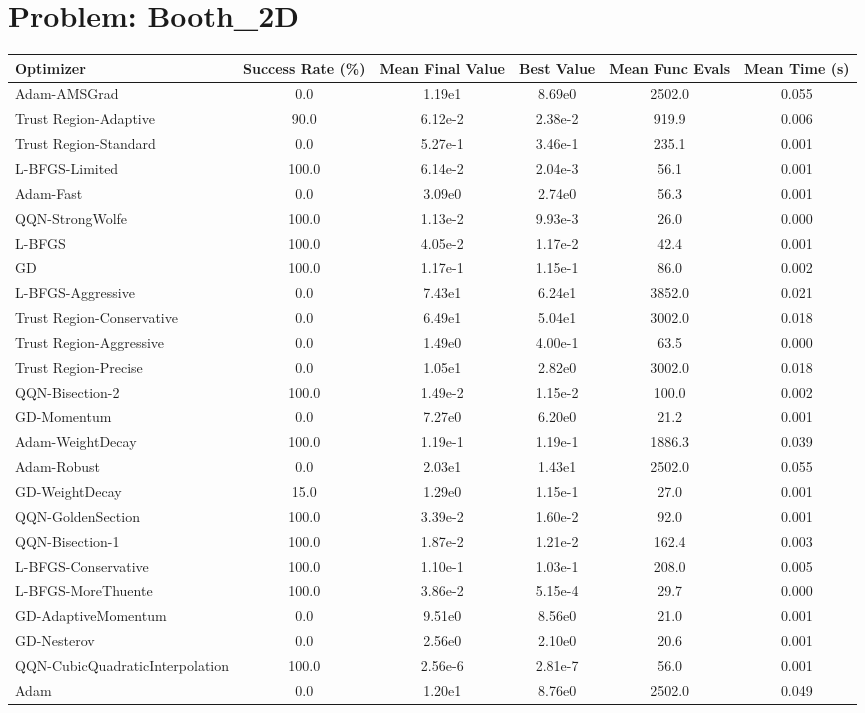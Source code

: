 \documentclass{article}
\begin{document}
\section{Problem: Booth\_2D}
\begin{longtable}{p{3cm}*{5}{c}}
\toprule
\textbf{Optimizer} & \textbf{Success Rate (\%)} & \textbf{Mean Final Value} & \textbf{Best Value} & \textbf{Mean Func Evals} & \textbf{Mean Time (s)} \\
\midrule
Adam-AMSGrad & 0.0 & 1.19e1 & 8.69e0 & 2502.0 & 0.055 \\
Trust Region-Adaptive & 90.0 & 6.12e-2 & 2.38e-2 & 919.9 & 0.006 \\
Trust Region-Standard & 0.0 & 5.27e-1 & 3.46e-1 & 235.1 & 0.001 \\
L-BFGS-Limited & 100.0 & 6.14e-2 & 2.04e-3 & 56.1 & 0.001 \\
Adam-Fast & 0.0 & 3.09e0 & 2.74e0 & 56.3 & 0.001 \\
QQN-StrongWolfe & 100.0 & 1.13e-2 & 9.93e-3 & 26.0 & 0.000 \\
L-BFGS & 100.0 & 4.05e-2 & 1.17e-2 & 42.4 & 0.001 \\
GD & 100.0 & 1.17e-1 & 1.15e-1 & 86.0 & 0.002 \\
L-BFGS-Aggressive & 0.0 & 7.43e1 & 6.24e1 & 3852.0 & 0.021 \\
Trust Region-Conservative & 0.0 & 6.49e1 & 5.04e1 & 3002.0 & 0.018 \\
Trust Region-Aggressive & 0.0 & 1.49e0 & 4.00e-1 & 63.5 & 0.000 \\
Trust Region-Precise & 0.0 & 1.05e1 & 2.82e0 & 3002.0 & 0.018 \\
QQN-Bisection-2 & 100.0 & 1.49e-2 & 1.15e-2 & 100.0 & 0.002 \\
GD-Momentum & 0.0 & 7.27e0 & 6.20e0 & 21.2 & 0.001 \\
Adam-WeightDecay & 100.0 & 1.19e-1 & 1.19e-1 & 1886.3 & 0.039 \\
Adam-Robust & 0.0 & 2.03e1 & 1.43e1 & 2502.0 & 0.055 \\
GD-WeightDecay & 15.0 & 1.29e0 & 1.15e-1 & 27.0 & 0.001 \\
QQN-GoldenSection & 100.0 & 3.39e-2 & 1.60e-2 & 92.0 & 0.001 \\
QQN-Bisection-1 & 100.0 & 1.87e-2 & 1.21e-2 & 162.4 & 0.003 \\
L-BFGS-Conservative & 100.0 & 1.10e-1 & 1.03e-1 & 208.0 & 0.005 \\
L-BFGS-MoreThuente & 100.0 & 3.86e-2 & 5.15e-4 & 29.7 & 0.000 \\
GD-AdaptiveMomentum & 0.0 & 9.51e0 & 8.56e0 & 21.0 & 0.001 \\
GD-Nesterov & 0.0 & 2.56e0 & 2.10e0 & 20.6 & 0.001 \\
QQN-CubicQuadraticInterpolation & 100.0 & 2.56e-6 & 2.81e-7 & 56.0 & 0.001 \\
Adam & 0.0 & 1.20e1 & 8.76e0 & 2502.0 & 0.049 \\
\bottomrule
\end{longtable}
\end{document}
